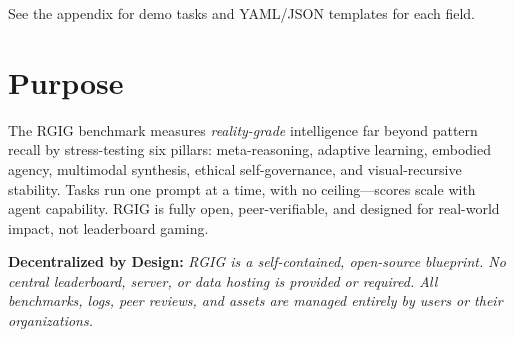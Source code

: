 \documentclass[11pt]{article}
\begin{document}
See the appendix for demo tasks and YAML/JSON templates for each field.

\tableofcontents

\section*{Purpose}
The RGIG benchmark measures \emph{reality-grade} intelligence far beyond pattern recall by stress-testing six pillars: meta-reasoning, adaptive learning, embodied agency, multimodal synthesis, ethical self-governance, and visual-recursive stability. Tasks run one prompt at a time, with no ceiling—scores scale with agent capability. RGIG is fully open, peer-verifiable, and designed for real-world impact, not leaderboard gaming.

\bigskip
\noindent\textbf{Decentralized by Design:} \emph{RGIG is a self-contained, open-source blueprint. No central leaderboard, server, or data hosting is provided or required. All benchmarks, logs, peer reviews, and assets are managed entirely by users or their organizations.}
\bigskip

\end{document}
